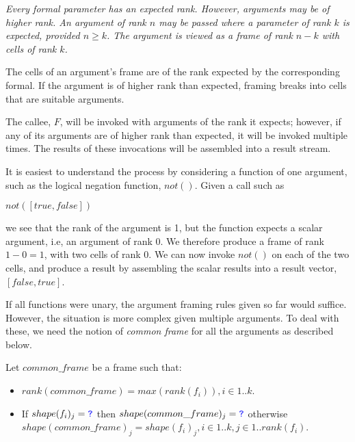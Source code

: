 \documentclass{article}
\begin{document}
{\em
Every formal parameter has an expected rank. However, arguments may be of higher rank. An argument of rank $n$ may be passed where a parameter of rank $k$ is expected, provided $n \ge k$. The argument is viewed as a frame of rank $n-k$ with cells of rank $k$. 

The cells of an argument's frame are of the rank expected by the corresponding formal. If the argument is of higher rank than expected, framing breaks into cells that are suitable 
arguments.

The callee, $F$, will be invoked with arguments of the rank it expects; however, if any of its arguments are of higher rank than expected, it will be invoked multiple times.
The results of these invocations will be assembled into a result stream. 

It is easiest to understand the process by considering a function of one argument, such as the logical negation function, $not()$. Given a call such as

$not([true, false])$

we see that the rank of the argument is 1, but the function expects a scalar argument, i.e, an argument of rank 0. We therefore produce a frame of rank $1 - 0 = 1$, with two cells of rank $0$.  We can now invoke $not()$ on each of the two cells, and produce a result by assembling the scalar results into a result vector, $[false, true]$.

If all functions were unary, the argument framing rules given so far would suffice. However, the situation is more complex given multiple arguments.
To deal with these, we need the notion of {\em common frame} for all the arguments as described below.
}

Let $common\_frame$ be a frame such that:
\begin{itemize}
\item  $rank(common\_frame) = max(rank(f_i)), i \in 1 ..k$. 
\item  If $shape(f_i)_j = \texttt{\color{blue} ?}{}$ then $shape(common\_frame)_j = \texttt{\color{blue} ?}{}$ otherwise $shape(common\_frame)_j =  shape(f_i)_j,i \in 1 ..k, j \in 1..rank(f_i)$.
\end{itemize}
\end{document}
